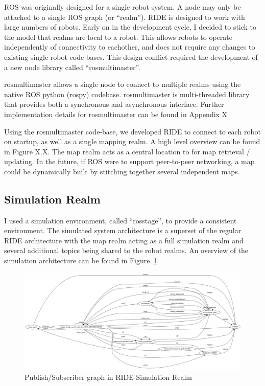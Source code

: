 ROS was originally designed for a single robot system. A node may only be attached to a single ROS graph (or ``realm''). RIDE is designed to work with large numbers of robots. Early on in the development cycle, I decided to stick to the model that realms are local to a robot. This allows robots to operate independently of connectivity to eachother, and does not require any changes to existing single-robot code bases. This design conflict required the development of a new node library called ``rosmultimaster''.

rosmultimaster allows a single node to connect to multiple realms using the native ROS python (rospy) codebase. rosmultimaster is multi-threaded library that provides both a synchronous and asynchronous interface. Further implementation details for rosmultimaster can be found in Appendix X %

Using the rosmultimaster code-base, we developed RIDE to connect to each robot on startup, as well as a single mapping realm. A high level overview can be found in Figure X.X. The map realm acts as a central location to for map retrieval / updating. In the future, if ROS were to support peer-to-peer networking, a map could be dynamically built by stitching together several independent maps. 


\subsection{Simulation Realm}
I used a simulation environment, called ``rosstage'', to provide a consistent environment. The simulated system architecture is a superset of the regular RIDE architecture with the map realm acting as a full simulation realm and several additional topics being shared to the robot realms. An overview of the simulation architecture can be found in Figure~\ref{fig:ride-simulation-realm}.

\begin{figure}[ht]
\includegraphics[width=\textwidth]{images/ride-simulation-realm.png}
\caption{Publish/Subscriber graph in RIDE Simulation Realm\label{fig:ride-simulation-realm}}
\end{figure}

